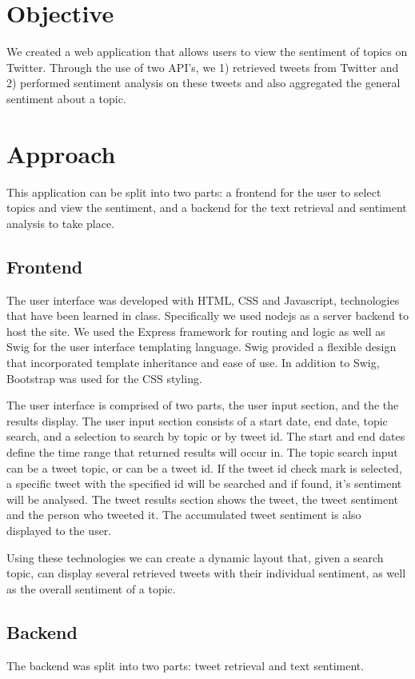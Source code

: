 \section{Objective}
We created a web application that allows users to view the sentiment of topics on Twitter. Through the use of two API’s, we 1) retrieved tweets from Twitter and 2) performed sentiment analysis on these tweets and also aggregated the general sentiment about a topic. 

\section{Approach}
This application can be split into two parts: a frontend for the user to select topics and view the sentiment, and a backend for the text retrieval and sentiment analysis to take place. 

\subsection{Frontend}
The user interface was developed with HTML, CSS and Javascript, technologies that have been learned in class. Specifically we used nodejs as a server backend to host the site. We used the Express framework for routing and logic as well as Swig for the user interface templating language. Swig provided a flexible design that incorporated template inheritance and ease of use. In addition to Swig, Bootstrap was used for the CSS styling. 

The user interface is comprised of two parts, the user input section, and the  the results display. The user input section consists of a start date, end date, topic search, and a selection to search by topic or by tweet id. The start and end dates define the time range that returned results will occur in. The topic search input can be a tweet topic, or can be a tweet id. If the tweet id check mark is selected, a specific tweet with the specified id will be searched and if found, it's sentiment will be analysed. The tweet results section shows the tweet, the tweet sentiment and the person who tweeted it. The accumulated tweet sentiment is also displayed to the user. 

Using these technologies we can create a dynamic layout that, given a search topic, can display several retrieved tweets with their individual sentiment, as well as the overall sentiment of a topic.

\subsection{Backend}
The backend was split into two parts: tweet retrieval and text sentiment. 

